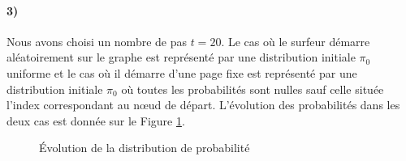 \documentclass[a4paper,titlepage]{report}
\begin{document}
\paragraph{3)} Nous avons choisi un nombre de pas $t = 20$. Le cas où le surfeur démarre aléatoirement sur le graphe est représenté par une distribution initiale $\pi_0$ uniforme et le cas où il démarre d'une page fixe est représenté par une distribution initiale $\pi_0$ où toutes les probabilités sont nulles sauf celle située l'index correspondant au nœud de départ. L'évolution des probabilités dans les deux cas est donnée sur le Figure \ref{fig:q113}.
\begin{figure}[h]
	\center
	\caption{Évolution de la distribution de probabilité}
	\label{fig:q113}
\end{figure}
\end{document}
